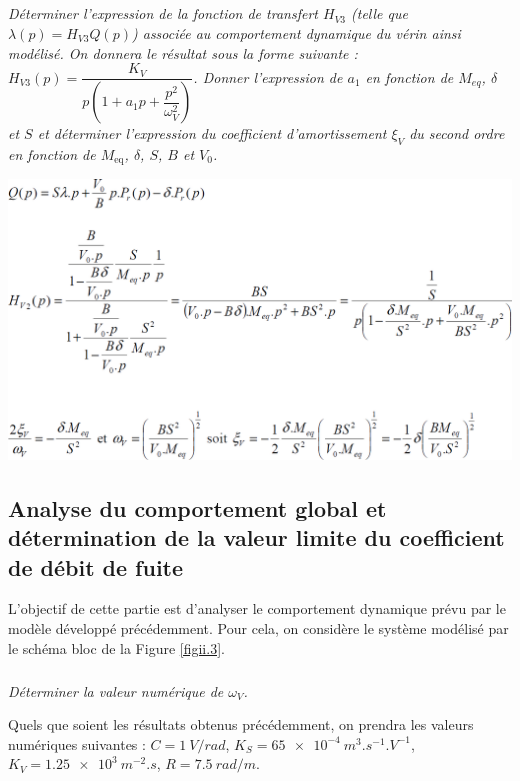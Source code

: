 \begin{multicols}{2}
\begin{multicols}{2}
\subparagraph{}\textit{Déterminer l'expression de la fonction de transfert $H_{V3}$ (telle que $\lambda(p) =  H_{V3} Q(p)$) associée au comportement dynamique du vérin ainsi modélisé. On donnera le résultat sous la forme suivante : 
$H_{V3}(p)=\dfrac{K_V}{p\left(1+a_1 p + \dfrac{p^2}{\omega_V^2} \right)}$.  
Donner l'expression de $a_1$ en fonction de $M_{eq}$, $\delta$ et $S$ et déterminer l'expression du coefficient d'amortissement $\xi_V$ du second ordre en fonction de $M_{\text{eq}}$, $\delta$, $S$, $B$ et $V_0$.}
\ifprof
\begin{corrige}
\begin{center}
\includegraphics[width=.95\linewidth]{images/cor_08}
\end{center}
\end{corrige}
\else
\fi


\subsection*{Analyse du comportement global et détermination de la valeur limite du coefficient de débit de fuite}


L'objectif de cette partie est d'analyser le comportement dynamique prévu par le modèle développé précédemment. Pour cela, on considère le système modélisé par le schéma bloc de la Figure \ref{figii.3}.


\subparagraph{}\textit{Déterminer la valeur numérique de $\omega_V$.}
\ifprof
\begin{corrige}
\end{corrige}
\else
\fi


Quels que soient les résultats obtenus précédemment, on prendra les valeurs numériques suivantes :
$C = \SI{1}{V/rad}$, $K_S = \SI{65e-4}{m^3.s^{-1}.V^{-1}}$, $K_V = \SI{1,25e3}{m^{-2}.s}$, $R = \SI{7,5}{rad/m}$.


\end{multicols}
\end{multicols}
